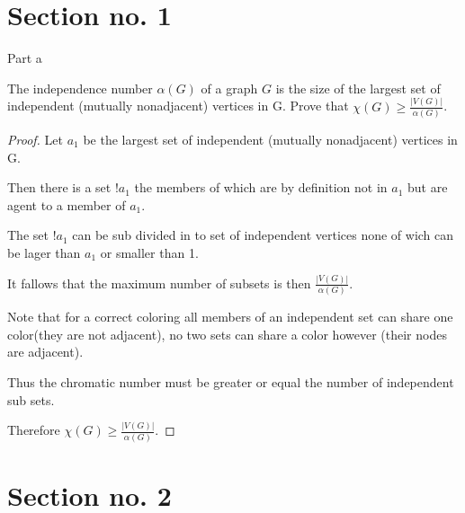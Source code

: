 \documentclass[9pt]{beamer}
\begin{document}
\section{Section no. 1}
\begin{frame}{Part a }
    \begin{problem}
    The independence number $\alpha(G)$ of a graph $G$ is the size of the largest set of independent (mutually nonadjacent) vertices in G. Prove that $\chi(G) \ge \frac{|V (G)|}{\alpha(G)}$.
     \end{problem}
    \begin{proof}
        Let $a_1$ be the largest set of independent (mutually nonadjacent) vertices in G.

        Then there is a set $!a_1$ the members of which are by definition not in $a_1$ but are agent to a member of $a_1$.

        The set $!a_1$ can be sub divided in to set of independent vertices none of wich can be lager than $a_1$ or smaller than 1.

        It fallows that the maximum number of subsets is then $\frac{|V (G)|}{\alpha(G)}$.

        Note that for a correct coloring all members of an independent set can share one color(they are not adjacent), no two sets can share a color however (their nodes are adjacent).

        Thus the chromatic number must be greater or equal the number of independent sub sets.

        Therefore $\chi(G) \ge \frac{|V (G)|}{\alpha(G)}$.
    \end{proof}
\end{frame}

\section{Section no. 2}
\end{document}
